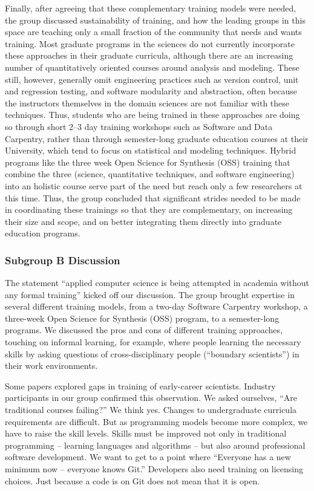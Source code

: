\documentclass[11pt, oneside]{amsart}
\begin{document}
Finally, after agreeing that these complementary training models were needed,
the group discussed sustainability of training, and how the leading groups in
this space are teaching only a small fraction of the community that needs and
wants training. Most graduate programs in the sciences do not currently
incorporate these approaches in their graduate curricula, although there are an
increasing number of quantitatively oriented courses around analysis and
modeling. These still, however, generally omit engineering practices such as
version control, unit and regression testing, and software modularity and
abstraction, often because the instructors themselves in the domain sciences are
not familiar with these techniques. Thus, students who are being trained in
these approaches are doing so through short 2--3 day training workshops such as
Software and Data Carpentry, rather than through semester-long graduate
education courses at their University, which tend to focus on statistical and
modeling techniques. Hybrid programs like the three week Open Science for
Synthesis (OSS) training that combine the three (science, quantitative
techniques, and software engineering) into an holistic course serve part of the
need but reach only a few researchers at this time. Thus, the group concluded
that significant strides needed to be made in coordinating these trainings so
that they are complementary, on increasing their size and scope, and on better
integrating them directly into graduate education programs.


\subsubsection{Subgroup B Discussion}
The statement ``applied computer science is being attempted in academia without
any formal training'' kicked off our discussion. The group brought expertise in
several different training models, from a two-day Software Carpentry workshop,
a three-week Open Science for Synthesis (OSS) program, to a semester-long
programs. We discussed the pros and cons of different training approaches,
touching on informal learning, for example, where people learning the necessary
skills by asking questions of cross-disciplinary people (``boundary scientists'') in
their work environments.

Some papers explored gaps in training of early-career scientists. Industry
participants in our group confirmed this observation. We asked ourselves, ``Are traditional
courses failing?'' We think yes. Changes to undergraduate curricula requirements
are difficult. But as programming models become more complex, we have to raise
the skill levels. Skills must be improved not only in traditional programming --
learning languages and algorithms -- but also around professional software
development. We want to get to a point where ``Everyone has a new minimum now --
everyone knows Git.'' Developers also need training on licensing choices. Just
because a code is on Git does not mean that it is open.
\end{document}

